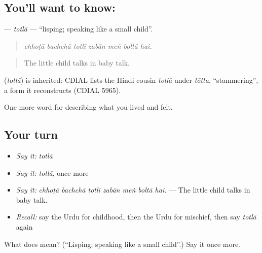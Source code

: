 \subsection*{You'll want to know: }
\textbf{} — \emph{totlā} — \textquotedblleft{}lisping; speaking like a small child\textquotedblright{}.

\begin{quote}
      
\end{quote}

\begin{quote}
\emph{chhoṭā bachchā totlī zabān meṅ boltā hai.}
\end{quote}

\begin{quote}
The little child talks in baby talk.
\end{quote}

\begin{cousinweb}
\textbf{} (\emph{totlā}) is inherited: CDIAL lists the Hindi cousin \emph{totlā} under \emph{tōtta}, \textquotedblleft{}stammering\textquotedblright{}, a form it reconstructs (CDIAL 5965).
\end{cousinweb}

\begin{grammarlens}[title={What you've built}]
One more word for describing what you lived and felt.
\end{grammarlens}

\subsection*{Your turn}
\begin{itemize}
\raggedright
  \item \emph{Say it:} \emph{totlā}
  \item \emph{Say it:} \emph{totlā}, once more
  \item \emph{Say it:} \emph{chhoṭā bachchā totlī zabān meṅ boltā hai.} — The little child talks in baby talk.
  \item \emph{Recall:} say the Urdu for childhood, then the Urdu for mischief, then say \emph{totlā} again
\end{itemize}

\begin{tcolorbox}[breakable,colback=teal!4,colframe=teal!35!black,title={Before you move on}]
What does  mean? (\textquotedblleft{}Lisping; speaking like a small child\textquotedblright{}.) Say it once more.
\end{tcolorbox}
